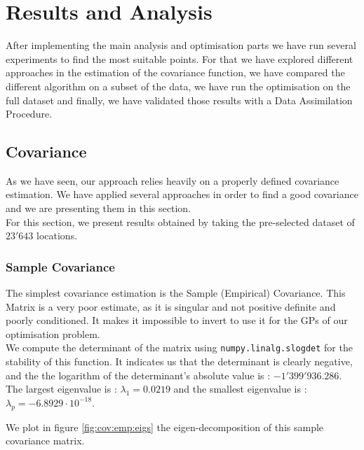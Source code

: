\chapter{Results and Analysis} \label{chap:results}
After implementing the main analysis and optimisation parts we have run several experiments to find the most suitable points. For that we have explored different approaches in the estimation of the covariance function, we have compared the different algorithm on a subset of the data, we have run the optimisation on the full dataset and finally, we have validated those results with a Data Assimilation Procedure. 


\section{Covariance}

As we have seen, our approach relies heavily on a properly defined covariance estimation. We have applied several approaches in order to find a good covariance and we are presenting them in this section. \\

For this section, we present results obtained by taking the pre-selected dataset of $23'643$ locations. 

\subsection{Sample Covariance}

The simplest covariance estimation is the Sample (Empirical) Covariance. This Matrix is a very poor estimate, as it is singular and not positive definite and poorly conditioned. It makes it impossible to invert to use it for the GPs of our optimisation problem. \\ 

We compute the determinant of the matrix using \texttt{numpy.linalg.slogdet} for the stability of this function. It indicates us that the determinant is clearly negative, and the the logarithm of the determinant's absolute value is : $-1'399'936.286$. The largest eigenvalue is : $\lambda_1 = 0.0219$ and the smallest eigenvalue is : $\lambda_p = -6.8929 \cdot 10^{-18}$.

We plot in figure \ref{fig:cov:emp:eigs} the eigen-decomposition of this sample covariance matrix.

